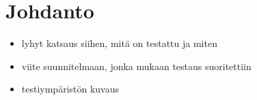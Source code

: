 \section{Johdanto}

\begin{itemize}
	\item lyhyt katsaus siihen, mitä on testattu ja miten
	\item viite suunnitelmaan, jonka mukaan testaus suoritettiin
	\item testiympäristön kuvaus
\end{itemize}
